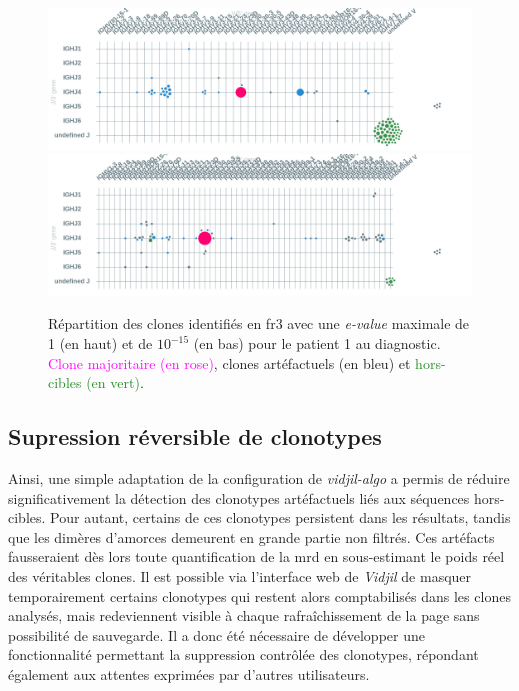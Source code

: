 \begin{figure}[H]
    \centering
    \includegraphics[width=1\textwidth]{images/diah_fr3_e1.png}
    \vspace{0.5cm}
    \includegraphics[width=1\textwidth]{images/diag_fr3_e-15.png}
    \caption{
        Répartition des clones identifiés en \gls{fr}3 avec une \textit{e-value} maximale de 1 (en haut) 
        et de $10^{-15}$ (en bas) pour le patient 1 au diagnostic. \textcolor{Magenta}{Clone majoritaire (en rose)}, 
        \textcolor{ProcessBlue}{clones artéfactuels (en bleu)} et \textcolor{ForestGreen}{hors-cibles (en vert)}.
    }
    \label{fig:fr3-evalue}
\end{figure}

\subsection{Supression réversible de clonotypes}

Ainsi, une simple adaptation de la configuration de \textit{vidjil-algo} a permis de réduire significativement la détection des clonotypes 
artéfactuels liés aux séquences hors-cibles. Pour autant, certains de ces clonotypes persistent dans les résultats, tandis que les dimères 
d'amorces demeurent en grande partie non filtrés. Ces artéfacts fausseraient dès lors toute quantification de la \gls{mrd} en sous-estimant 
le poids réel des véritables clones.
Il est possible via l'interface web de \textit{Vidjil} de masquer temporairement certains 
clonotypes qui restent alors comptabilisés dans les clones analysés, mais redeviennent visible à chaque rafraîchissement de la page sans 
possibilité de sauvegarde. Il a donc été nécessaire de développer une fonctionnalité permettant la suppression contrôlée des clonotypes, 
répondant également aux attentes exprimées par d'autres utilisateurs.

